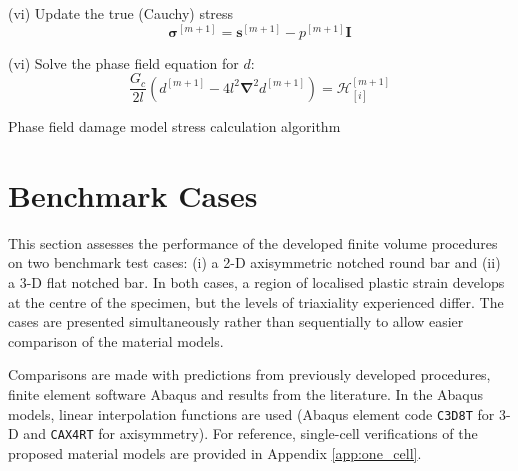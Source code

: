 \documentclass[sn-mathphys,Numbered]{sn-jnl}%
\newcommand{\bb}{\boldsymbol}
\begin{document}
\begin{algorithm}[htbp]
(vi) Update the true (Cauchy) stress
\begin{equation}
	\boldsymbol{\sigma}^{[m+1]} = \boldsymbol{s}^{[m+1]} -  p^{[m+1]}\textbf{I} \nonumber
\end{equation}


(vi) Solve the phase field equation for $d$:
\begin{equation}
	\frac{G_c}{2l}\left(d^{[m+1]} -4l^2 \bb{\nabla}^2 d^{[m+1]} \right) =
	\mathcal{H}^{[m+1]}_{[i]} %
	 \nonumber
\end{equation}

\caption{Phase field damage model stress calculation algorithm}
\end{algorithm}




















\section{Benchmark Cases} \label{sec:test_cases}

This section assesses the performance of the developed finite volume procedures on two benchmark test cases: (i) a 2-D axisymmetric notched round bar and (ii) a 3-D flat notched bar. %
In both cases, a region of localised plastic strain develops at the centre of the specimen, but the levels of triaxiality experienced differ.
The cases are presented simultaneously rather than sequentially to allow easier comparison of the material models.



Comparisons are made with predictions from previously developed procedures, finite element software Abaqus and results from the literature.
In the Abaqus models, linear interpolation functions are used (Abaqus element code \texttt{C3D8T} for 3-D and \texttt{CAX4RT} for axisymmetry).
For reference, single-cell verifications of the proposed material models are provided in Appendix \ref{app:one_cell}.
\end{document}
